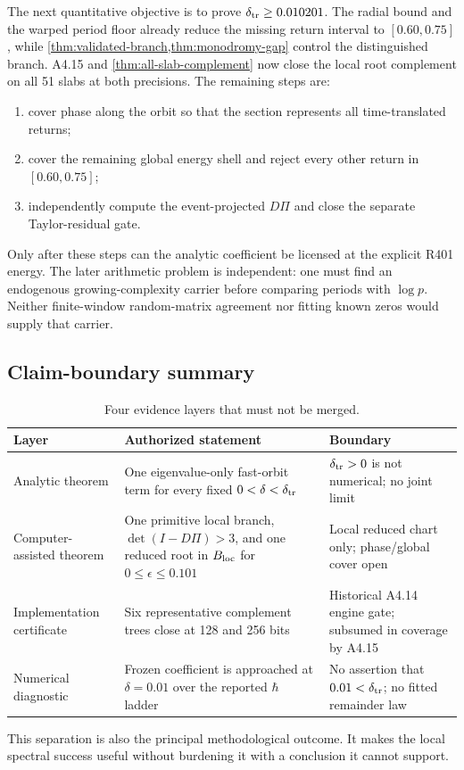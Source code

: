 The next quantitative objective is to prove
\(\delta_{\rm tr}\ge0.010201\).  The radial bound and the warped period floor
already reduce the missing return interval to \([0.60,0.75]\), while
\cref{thm:validated-branch,thm:monodromy-gap} control the distinguished
branch.  A4.15 and \cref{thm:all-slab-complement} now close the local root
complement on all 51 slabs at both precisions.  The
remaining steps are:
\begin{enumerate}[leftmargin=*]
 \item cover phase along the orbit so that the section represents all
 time-translated returns;
 \item cover the remaining global energy shell and reject every other return
 in \([0.60,0.75]\);
 \item independently compute the event-projected \(D\Pi\) and close the
 separate Taylor-residual gate.
\end{enumerate}
Only after these steps can the analytic coefficient be licensed at the
explicit R401 energy.  The later arithmetic problem is independent: one must
find an endogenous growing-complexity carrier before comparing periods with
\(\log p\).  Neither finite-window random-matrix agreement nor fitting known
zeros would supply that carrier.

\subsection{Claim-boundary summary}

\begin{table}[t]
\centering
\caption{Four evidence layers that must not be merged.}
\label{tab:evidence-layers}
\small
\begin{tabular}{@{}p{}p{}p{}@{}}
\toprule
Layer & Authorized statement & Boundary\\
\midrule
Analytic theorem & One eigenvalue-only fast-orbit term for every fixed
\(0<\delta<\delta_{\rm tr}\) &
\(\delta_{\rm tr}>0\) is not numerical; no joint limit\\
Computer-assisted theorem & One primitive local branch,
\(\det(I-D\Pi)>3\), and one reduced root in \(B_{\rm loc}\) for
\(0\le\epsilon\le0.101\) &
Local reduced chart only; phase/global cover open\\
Implementation certificate & Six representative complement trees close at
128 and 256 bits &
Historical A4.14 engine gate; subsumed in coverage by A4.15\\
Numerical diagnostic & Frozen coefficient is approached at
\(\delta=0.01\) over the reported \(\hbar\) ladder &
No assertion that \(0.01<\delta_{\rm tr}\); no fitted remainder law\\
\bottomrule
\end{tabular}
\end{table}

This separation is also the principal methodological outcome.  It makes
the local spectral success useful without burdening it with a conclusion it
cannot support.
